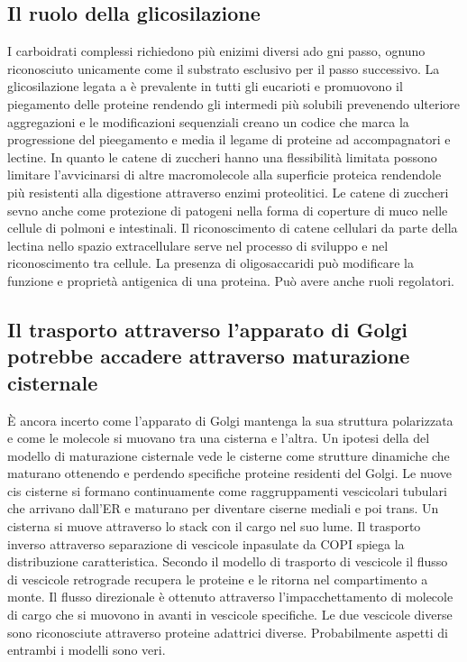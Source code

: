 \subsection{Il ruolo della glicosilazione}
I carboidrati complessi richiedono pi\`u enizimi diversi ado gni passo, ognuno riconosciuto unicamente come il substrato esclusivo per il passo successivo. La glicosilazione legata a 
 \`e prevalente in tutti gli eucarioti e promuovono il piegamento delle proteine rendendo gli intermedi pi\`u solubili prevenendo ulteriore aggregazioni e le modificazioni 
sequenziali creano un codice che marca la progressione del pieegamento e media il legame di proteine ad accompagnatori e lectine. In quanto le catene di zuccheri hanno una flessibilit\`a
limitata possono limitare l'avvicinarsi di altre macromolecole alla superficie proteica rendendole pi\`u resistenti alla digestione attraverso enzimi proteolitici. Le catene di 
zuccheri sevno anche come protezione di patogeni nella forma di coperture di muco nelle cellule di polmoni e intestinali. Il riconoscimento di catene cellulari da parte della lectina
nello spazio extracellulare serve nel processo di sviluppo e nel riconoscimento tra cellule. La presenza di oligosaccaridi pu\`o modificare la funzione e propriet\`a antigenica di 
una proteina. Pu\`o avere anche ruoli regolatori. 
\subsection{Il trasporto attraverso l'apparato di Golgi potrebbe accadere attraverso maturazione cisternale}
\`E ancora incerto come l'apparato di Golgi mantenga la sua struttura polarizzata e come le molecole si muovano tra una cisterna e l'altra. Un ipotesi della del modello di maturazione
cisternale vede le cisterne come strutture dinamiche che maturano ottenendo e perdendo specifiche proteine residenti del Golgi. Le nuove cis cisterne si formano continuamente come
raggruppamenti vescicolari tubulari che arrivano dall'ER e maturano per diventare ciserne mediali e poi trans. Un cisterna si muove attraverso lo stack con il cargo nel suo lume. Il
trasporto inverso attraverso separazione di vescicole inpasulate da COPI spiega la distribuzione caratteristica. Secondo il modello di trasporto di vescicole il flusso di vescicole
retrograde recupera le proteine e le ritorna nel compartimento a monte. Il flusso direzionale \`e ottenuto attraverso l'impacchettamento di molecole di cargo che si muovono in avanti
in vescicole specifiche. Le due vescicole diverse sono riconosciute attraverso proteine adattrici diverse. Probabilmente aspetti di entrambi i modelli sono veri. 
